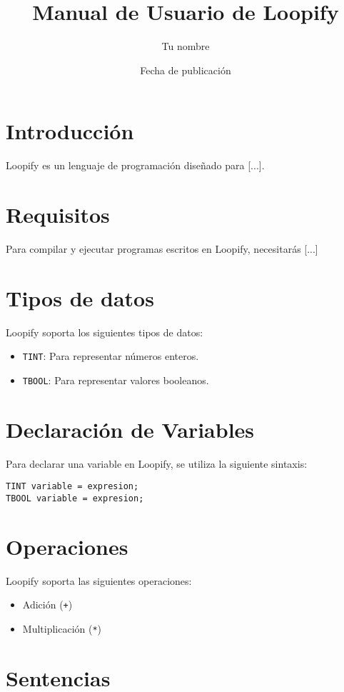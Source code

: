 \documentclass[12pt]{article}
\title{Manual de Usuario de Loopify}
\author{Tu nombre}
\date{Fecha de publicación}
\begin{document}
\maketitle

\tableofcontents

\section{Introducción}
Loopify es un lenguaje de programación diseñado para [...].

\section{Requisitos}
Para compilar y ejecutar programas escritos en Loopify, necesitarás [...]

\section{Tipos de datos}
Loopify soporta los siguientes tipos de datos:
\begin{itemize}
    \item \texttt{TINT}: Para representar números enteros.
    \item \texttt{TBOOL}: Para representar valores booleanos.
\end{itemize}

\section{Declaración de Variables}
Para declarar una variable en Loopify, se utiliza la siguiente sintaxis:
\begin{lstlisting}
TINT variable = expresion;
TBOOL variable = expresion;
\end{lstlisting}

\section{Operaciones}
Loopify soporta las siguientes operaciones:
\begin{itemize}
    \item Adición (\texttt{+})
    \item Multiplicación (\texttt{*})
\end{itemize}

\section{Sentencias}
\end{document}
